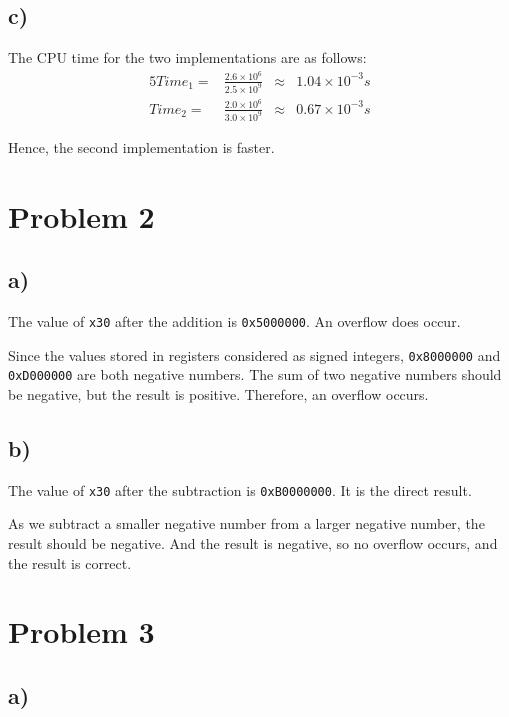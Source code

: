 \documentclass[a4paper,12pt]{article}
\begin{document}
\subsection*{c)}

The CPU time for the two implementations are as follows:
\begin{alignat*}{5}
	Time_1 =& \frac{2.6 \times 10^6}{2.5 \times 10^9} &\approx& 1.04 \times 10^{-3} s \\
	Time_2 =& \frac{2.0 \times 10^6}{3.0 \times 10^9} &\approx& 0.67 \times 10^{-3} s
\end{alignat*}

Hence, the second implementation is faster.

\section*{Problem 2}

\subsection*{a)}

The value of \texttt{x30} after the addition is \texttt{0x5000000}.
An overflow does occur.

Since the values stored in registers considered as signed integers, \texttt{0x8000000} and \texttt{0xD000000} are both negative numbers. 
The sum of two negative numbers should be negative, but the result is positive.
Therefore, an overflow occurs.

\subsection*{b)}

The value of \texttt{x30} after the subtraction is \texttt{0xB0000000}.
It is the direct result.

As we subtract a smaller negative number from a larger negative number, the result should be negative.
And the result is negative, so no overflow occurs, and the result is correct.

\section*{Problem 3}

\subsection*{a)}
\end{document}
